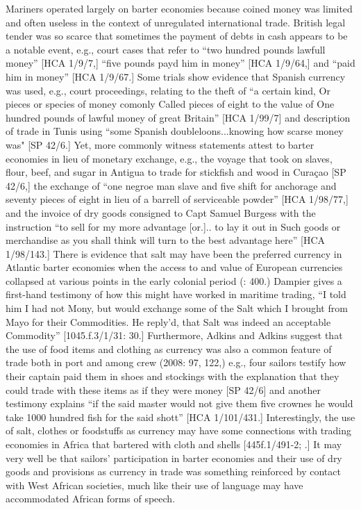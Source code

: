 Mariners operated largely on barter economies because coined money was limited and often useless in the context of unregulated international trade. British legal tender was so scarce that sometimes the payment of debts in cash appears to be a notable event, e.g., court cases that refer to “two hundred pounds lawfull money” [HCA 1/9/7,] “five pounds payd him in money” [HCA 1/9/64,] and “paid him in money” [HCA 1/9/67.] Some trials show evidence that Spanish currency was used, e.g., court proceedings, relating to the theft of “a certain kind, Or pieces or species of money comonly Called pieces of eight to the value of One hundred pounds of lawful money of great Britain” [HCA 1/99/7] and description of trade in Tunis using “some Spanish doubleloons...knowing how scarse money was" [SP 42/6.] Yet, more commonly witness statements attest to barter economies in lieu of monetary exchange, e.g., the voyage that took on slaves, flour, beef, and sugar in Antigua to trade for stickfish and wood in Curaçao [SP 42/6,] the exchange of “one negroe man slave and five shift for anchorage and seventy pieces of eight in lieu of a barrell of serviceable powder” [HCA 1/98/77,] and the invoice of dry goods consigned to Capt Samuel Burgess with the instruction “to sell for my more advantage [or.].. to lay it out in Such goods or merchandise as you shall think will turn to the best advantage here” [HCA 1/98/143.] There is evidence that salt may have been the preferred currency in Atlantic barter economies when the access to and value of European currencies collapsed at various points in the early colonial period (\citealt{Jarvis2010}: 400.) Dampier gives a first-hand testimony of how this might have worked in maritime trading, “I told him I had not Mony, but would exchange some of the Salt which I brought from Mayo for their Commodities. He reply’d, that Salt was indeed an acceptable Commodity” [1045.f.3/1/31: 30.] Furthermore, Adkins and Adkins suggest that the use of food items and clothing as currency was also a common feature of trade both in port and among crew (2008: 97, 122,) e.g., four sailors testify how their captain paid them in shoes and stockings with the explanation that they could trade with these items as if they were money [SP 42/6] and another testimony explains “if the said master would not give them five crownes he would take 1000 hundred fish for the said shott” [HCA 1/101/431.] Interestingly, the use of salt, clothes or foodstuffs as currency may have some connections with trading economies in Africa that bartered with cloth and shells [445f.1/491-2; \citealt{HogendornJohnson2003}.] It may very well be that sailors’ participation in barter economies and their use of dry goods and provisions as currency in trade was something reinforced by contact with West African societies, much like their use of language may have accommodated African forms of speech. 

